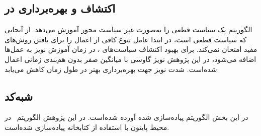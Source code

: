         \subsection{اکتشاف و بهره‌برداری در 
 }
 الگوریتم
  یک سیاست قطعی را به‌صورت غیر سیاست محور آموزش می‌دهد. از آنجایی که سیاست قطعی است،
در ابتدا عامل تنوع کافی از اعمال را برای یافتن روش‌های مفید امتحان نمی‌کند. برای بهبود اکتشاف سیاست‌های ،
در زمان آموزش
 نویز به عمل‌ها اضافه می‌شود، در این پژوهش نویز گاوسی با میانگین صفر بدون هم‌بندی زمانی اعمال شده‌است.
 شدت نویز جهت بهره‌برداری بهتر در طول زمان کاهش می‌یابد.
  
  \subsection{شبه‌کد 
  }
   در این بخش الگوریتم
  پیاده‌سازی شده آورده شده‌است. در این پژوهش الگوریتم~ در محیط پایتون با استفاده از کتابخانه
   \cite{paszke2017automatic}
  پیاده‌سازی شده‌‌است.
         
